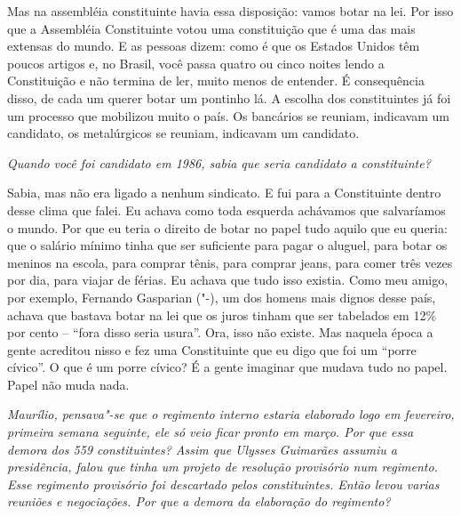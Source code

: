 Mas na assembléia constituinte havia essa disposição: vamos botar na
lei. Por isso que a Assembléia Constituinte votou uma constituição que é
uma das mais extensas do mundo. E as pessoas dizem: como é que os
Estados Unidos têm poucos artigos e, no Brasil, você passa quatro ou
cinco noites lendo a Constituição e não termina de ler, muito menos de
entender. É consequência disso, de cada um querer botar um pontinho lá.
A escolha dos constituintes já foi um processo que mobilizou muito o
país. Os bancários se reuniam, indicavam um candidato, os metalúrgicos
se reuniam, indicavam um candidato.

\medskip

\noindent\emph{Quando você foi candidato em 1986, sabia que seria candidato a
constituinte?}

Sabia, mas não era ligado a nenhum sindicato. E fui
para a Constituinte dentro desse clima que falei. Eu achava como toda
esquerda achávamos que salvaríamos o mundo. Por que eu teria o direito
de botar no papel tudo aquilo que eu queria: que o salário mínimo tinha
que ser suficiente para pagar o aluguel, para botar os meninos na
escola, para comprar tênis, para comprar jeans, para comer três vezes
por dia, para viajar de férias. Eu achava que tudo isso existia. Como
meu amigo, por exemplo, Fernando Gasparian ("-), um dos homens mais
dignos desse país, achava que bastava botar na lei que os juros tinham
que ser tabelados em 12\% por cento -- ``fora disso seria usura''. Ora,
isso não existe. Mas naquela época a gente acreditou nisso e fez uma
Constituinte que eu digo que foi um ``porre cívico''. O que é um porre
cívico? É a gente imaginar que mudava tudo no papel. Papel não muda
nada.

\medskip

\noindent\emph{Maurílio, pensava"-se que o regimento interno estaria elaborado
logo em fevereiro, primeira semana seguinte, ele só veio ficar pronto em
março. Por que essa demora dos 559 constituintes? Assim que Ulysses
Guimarães assumiu a presidência, falou que tinha um projeto de resolução
provisório num regimento. Esse regimento provisório foi descartado pelos
constituintes. Então levou varias reuniões e negociações. Por que a
demora da elaboração do regimento?}

